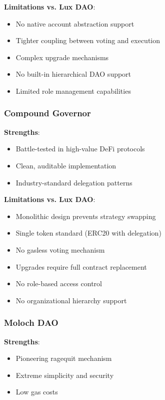 \documentclass[11pt,a4paper]{article}
\begin{document}
\textbf{Limitations vs. Lux DAO}:
\begin{itemize}
    \item No native account abstraction support
    \item Tighter coupling between voting and execution
    \item Complex upgrade mechanisms
    \item No built-in hierarchical DAO support
    \item Limited role management capabilities
\end{itemize}

\subsubsection{Compound Governor}

\textbf{Strengths}:
\begin{itemize}
    \item Battle-tested in high-value DeFi protocols
    \item Clean, auditable implementation
    \item Industry-standard delegation patterns
\end{itemize}

\textbf{Limitations vs. Lux DAO}:
\begin{itemize}
    \item Monolithic design prevents strategy swapping
    \item Single token standard (ERC20 with delegation)
    \item No gasless voting mechanism
    \item Upgrades require full contract replacement
    \item No role-based access control
    \item No organizational hierarchy support
\end{itemize}

\subsubsection{Moloch DAO}

\textbf{Strengths}:
\begin{itemize}
    \item Pioneering ragequit mechanism
    \item Extreme simplicity and security
    \item Low gas costs
\end{itemize}
\end{document}
